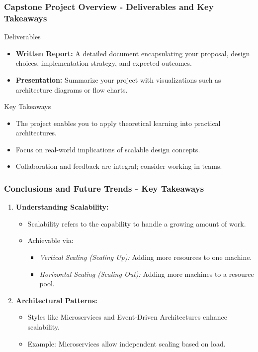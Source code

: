 \documentclass[aspectratio=169]{beamer}
\begin{document}
\begin{frame}[fragile]
    \frametitle{Capstone Project Overview - Deliverables and Key Takeaways}
    \begin{block}{Deliverables}
        \begin{itemize}
            \item \textbf{Written Report:} A detailed document encapsulating your proposal, design choices, implementation strategy, and expected outcomes.
            \item \textbf{Presentation:} Summarize your project with visualizations such as architecture diagrams or flow charts.
        \end{itemize}
    \end{block}

    \begin{block}{Key Takeaways}
        \begin{itemize}
            \item The project enables you to apply theoretical learning into practical architectures.
            \item Focus on real-world implications of scalable design concepts.
            \item Collaboration and feedback are integral; consider working in teams.
        \end{itemize}
    \end{block}
\end{frame}

\begin{frame}[fragile]
    \frametitle{Conclusions and Future Trends - Key Takeaways}
    
    \begin{enumerate}
        \item \textbf{Understanding Scalability:}
        \begin{itemize}
            \item Scalability refers to the capability to handle a growing amount of work.
            \item Achievable via:
            \begin{itemize}
                \item \textit{Vertical Scaling (Scaling Up):} Adding more resources to one machine.
                \item \textit{Horizontal Scaling (Scaling Out):} Adding more machines to a resource pool.
            \end{itemize}
        \end{itemize}
        
        \item \textbf{Architectural Patterns:}
        \begin{itemize}
            \item Styles like Microservices and Event-Driven Architectures enhance scalability.
            \item Example: Microservices allow independent scaling based on load.
        \end{itemize}
    \end{enumerate}
\end{frame}
\end{document}
